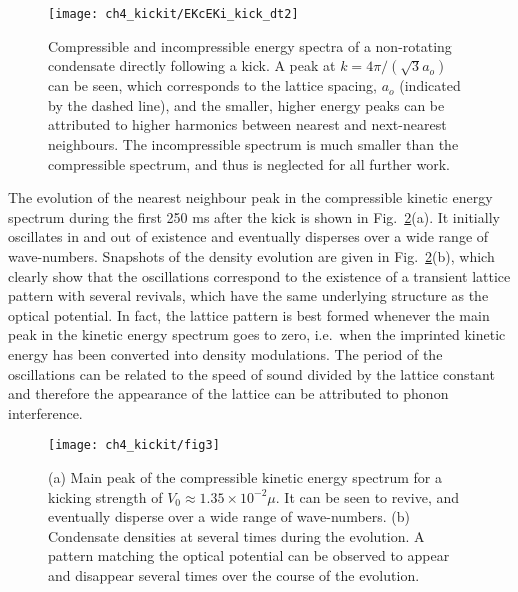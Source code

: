 \begin{figure}[tb]
    \centering
    \texttt{[image: ch4\_kickit/EKcEKi\_kick\_dt2]}
    \caption{Compressible and incompressible energy spectra of a non-rotating condensate directly following a kick. A peak at $k=4\pi/(\sqrt{3}a_o)$ can be seen, which corresponds to the lattice spacing, $a_o$ (indicated by the dashed line), and the smaller, higher energy peaks can be attributed to higher harmonics between nearest and next-nearest neighbours. The incompressible spectrum is much smaller than the compressible spectrum, and thus is neglected for all further work.}
    \label{fig:ekc_eki_novtx}
\end{figure}



The evolution of the nearest neighbour peak in the compressible kinetic energy spectrum during the first 250 ms after the kick is shown in Fig.~\ref{fig:novtx_p5k}(a). It initially oscillates in and out of existence and eventually disperses over a wide range of wave-numbers. Snapshots of the density evolution are given in Fig.~\ref{fig:novtx_p5k}(b), which clearly show that the oscillations correspond to the existence of a transient lattice pattern with several revivals, which have the same underlying structure as the optical potential. In fact, the lattice pattern is best formed whenever the main peak in the kinetic energy spectrum goes to zero, i.e.~when the imprinted kinetic energy has been converted into density modulations. The period of the oscillations can be related to the speed of sound divided by the lattice constant and therefore the appearance of the lattice can be attributed to phonon interference.


\begin{figure}[tb]
    \centering

	\texttt{[image: ch4\_kickit/fig3]}
	\caption{(a) Main peak of the compressible kinetic energy spectrum for a kicking strength of $V_0 \approx 1.35\times10^{-2}\mu$. It can be seen to revive, and eventually disperse over a wide range of wave-numbers.  (b) Condensate densities at several times during the evolution. A pattern matching the optical potential can be observed to appear and disappear several times over the course of the evolution.}
	\label{fig:novtx_p5k}
\end{figure}



